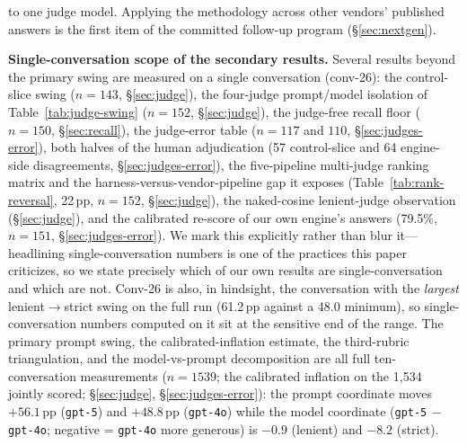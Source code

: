 \documentclass[11pt]{article}
\begin{document}
to one judge model. Applying the methodology across other vendors' published answers is the first item of the committed follow-up program (\S\ref{sec:nextgen}).

\textbf{Single-conversation scope of the secondary results.} Several results beyond the primary swing are measured on a single conversation (conv-26): the control-slice swing ($n=143$, \S\ref{sec:judge}), the four-judge prompt/model isolation of Table~\ref{tab:judge-swing} ($n=152$, \S\ref{sec:judge}), the judge-free recall floor ($n=150$, \S\ref{sec:recall}), the judge-error table ($n=117$ and $110$, \S\ref{sec:judges-error}), both halves of the human adjudication (57 control-slice and 64 engine-side disagreements, \S\ref{sec:judges-error}), the five-pipeline multi-judge ranking matrix and the harness-versus-vendor-pipeline gap it exposes (Table~\ref{tab:rank-reversal}, 22\,pp, $n=152$, \S\ref{sec:judge}), the naked-cosine lenient-judge observation (\S\ref{sec:judge}), and the calibrated re-score of our own engine's answers (79.5\%, $n=151$, \S\ref{sec:judges-error}). We mark this explicitly rather than blur it---headlining single-conversation numbers is one of the practices this paper criticizes, so we state precisely which of our own results are single-conversation and which are not. Conv-26 is also, in hindsight, the conversation with the \emph{largest} lenient$\to$strict swing on the full run (61.2\,pp against a 48.0 minimum), so single-conversation numbers computed on it sit at the sensitive end of the range. The primary prompt swing, the calibrated-inflation estimate, the third-rubric triangulation, and the model-vs-prompt decomposition are all full ten-conversation measurements ($n=1539$; the calibrated inflation on the 1{,}534 jointly scored; \S\ref{sec:judge}, \S\ref{sec:judges-error}): the prompt coordinate moves $+56.1$\,pp (\texttt{gpt-5}) and $+48.8$\,pp (\texttt{gpt-4o}) while the model coordinate (\texttt{gpt-5}$\,{-}\,$\texttt{gpt-4o}; negative = \texttt{gpt-4o} more generous) is $-0.9$ (lenient) and $-8.2$ (strict).
\end{document}
